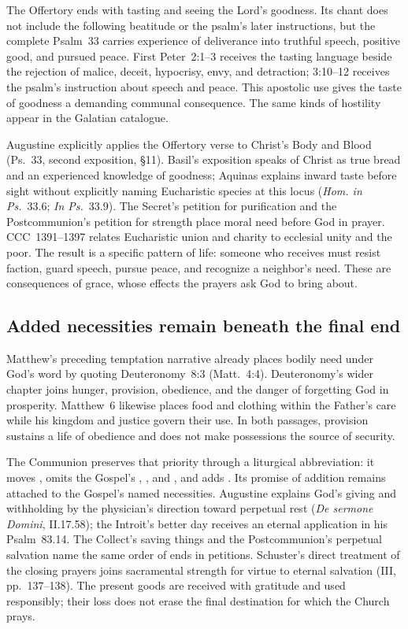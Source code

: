 The Offertory ends with tasting and seeing the Lord's goodness. Its chant
does not include the following beatitude or the psalm's later instructions,
but the complete Psalm~33 carries experience of deliverance into truthful
speech, positive good, and pursued peace. First Peter~2:1--3 receives the
tasting language beside the rejection of malice, deceit, hypocrisy, envy,
and detraction; 3:10--12 receives the psalm's instruction about speech and
peace. This apostolic use gives the taste of goodness a demanding communal
consequence. The same kinds of hostility appear in the Galatian catalogue.

Augustine explicitly applies the Offertory verse to Christ's Body and Blood
(Ps.~33, second exposition, §11).
Basil's exposition speaks of Christ as true bread and an experienced knowledge
of goodness; Aquinas explains inward taste before sight without explicitly
naming Eucharistic species at this locus (\emph{Hom. in Ps.}~33.6;
\emph{In Ps.}~33.9). The Secret's petition for purification and the
Postcommunion's petition for strength place moral need before God in prayer.
CCC~1391--1397 relates Eucharistic union and charity to ecclesial unity and
the poor. The result is a specific pattern of life: someone who receives
must resist faction, guard speech, pursue peace, and recognize a neighbor's
need. These are consequences of grace, whose effects the prayers ask God to
bring about.

\subsection*{Added necessities remain beneath the final end\enspace{}}

Matthew's preceding temptation narrative already places bodily need under
God's word by quoting Deuteronomy~8:3 (Matt.~4:4). Deuteronomy's wider chapter
joins hunger, provision, obedience, and the danger of forgetting God in
prosperity. Matthew~6 likewise places food and clothing within the Father's
care while his kingdom and justice govern their use. In both passages,
provision sustains a life of obedience and does not make possessions the
source of security.

The Communion preserves that priority through a liturgical abbreviation:
it moves , omits the Gospel's , , and , and adds . Its promise of
addition remains attached to the Gospel's named necessities. Augustine
explains God's giving and withholding by the physician's direction toward
perpetual rest (\emph{De sermone Domini}, II.17.58); the Introit's better day
receives an eternal application in his Psalm~83.14. The Collect's saving
things and the Postcommunion's perpetual salvation name the same order of
ends in petitions. Schuster's direct treatment of the closing prayers joins
sacramental strength for virtue to eternal salvation (III, pp.~137--138).
The present goods are received with gratitude and used responsibly; their
loss does not erase the final destination for which the Church prays.
